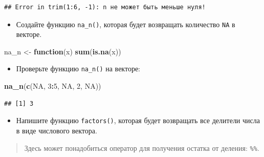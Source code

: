 \documentclass[]{book}
\newenvironment{Shaded}{\begin{snugshade}}{\end{snugshade}}
\newcommand{\KeywordTok}[1]{\textcolor[rgb]{0.13,0.29,0.53}{\textbf{#1}}}
\newcommand{\DecValTok}[1]{\textcolor[rgb]{0.00,0.00,0.81}{#1}}
\newcommand{\StringTok}[1]{\textcolor[rgb]{0.31,0.60,0.02}{#1}}
\newcommand{\OtherTok}[1]{\textcolor[rgb]{0.56,0.35,0.01}{#1}}
\newcommand{\ControlFlowTok}[1]{\textcolor[rgb]{0.13,0.29,0.53}{\textbf{#1}}}
\newcommand{\OperatorTok}[1]{\textcolor[rgb]{0.81,0.36,0.00}{\textbf{#1}}}
\newcommand{\NormalTok}[1]{#1}
\providecommand{\tightlist}{%
  \setlength{\itemsep}{0pt}\setlength{\parskip}{0pt}}
\begin{document}
\begin{verbatim}
## Error in trim(1:6, -1): n не может быть меньше нуля!
\end{verbatim}

\begin{itemize}
\tightlist
\item
  Создайте функцию \texttt{na\_n()}, которая будет возвращать количество
  \texttt{NA} в векторе.
\end{itemize}

\begin{Shaded}
\begin{Highlighting}[]
\NormalTok{na_n <-}\StringTok{ }\ControlFlowTok{function}\NormalTok{(x) }\KeywordTok{sum}\NormalTok{(}\KeywordTok{is.na}\NormalTok{(x))}
\end{Highlighting}
\end{Shaded}

\begin{itemize}
\tightlist
\item
  Проверьте функцию \texttt{na\_n()} на векторе:
\end{itemize}

\begin{Shaded}
\begin{Highlighting}[]
\KeywordTok{na_n}\NormalTok{(}\KeywordTok{c}\NormalTok{(}\OtherTok{NA}\NormalTok{, }\DecValTok{3}\OperatorTok{:}\DecValTok{5}\NormalTok{, }\OtherTok{NA}\NormalTok{, }\DecValTok{2}\NormalTok{, }\OtherTok{NA}\NormalTok{))}
\end{Highlighting}
\end{Shaded}

\begin{verbatim}
## [1] 3
\end{verbatim}

\begin{itemize}
\tightlist
\item
  Напишите функцию \texttt{factors()}, которая будет возвращать все
  делители числа в виде числового вектора.
\end{itemize}

\begin{quote}
Здесь может понадобиться оператор для получения остатка от деления:
\texttt{\%\%}.
\end{quote}

\begin{Shaded}
\end{Shaded}
\end{document}
